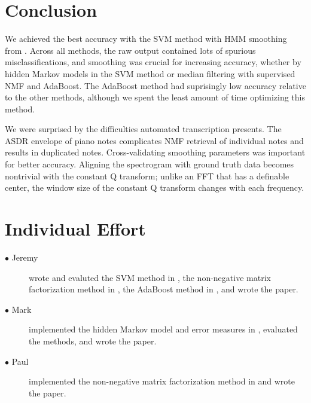 \documentclass[5p]{elsarticle}
\begin{document}
\section{Conclusion}

We achieved the best accuracy with the SVM method with HMM smoothing from \citet{poliner2006discriminative}. Across all methods, the raw output contained lots of spurious misclassifications, and smoothing was crucial for increasing accuracy, whether by hidden Markov models in the SVM method or median filtering with supervised NMF and AdaBoost. The AdaBoost method had suprisingly low accuracy relative to the other methods, although we spent the least amount of time optimizing this method. 

We were surprised by the difficulties automated transcription presents. The ASDR envelope of piano notes complicates NMF retrieval of individual notes and results in duplicated notes. Cross-validating smoothing parameters was important for better accuracy. Aligning the spectrogram with ground truth data becomes nontrivial with the constant Q transform; unlike an FFT that has a definable center, the window size of the constant Q transform changes with each frequency. 




\section{Individual Effort}
\begin{description}
\item[$\bullet$ Jeremy] wrote and evaluted the SVM method in \citet{poliner2006discriminative}, the non-negative matrix factorization method in \citet{abdallah2004polyphonic}, the AdaBoost method in \citet{boogaart2009note}, and wrote the paper.
\item[$\bullet$ Mark] implemented the hidden Markov model and error measures in \citet{poliner2006discriminative}, evaluated the methods, and wrote the paper.
\item[$\bullet$ Paul] implemented the non-negative matrix factorization method in \citet{abdallah2004polyphonic} and wrote the paper.
\end{description}
\end{document}
